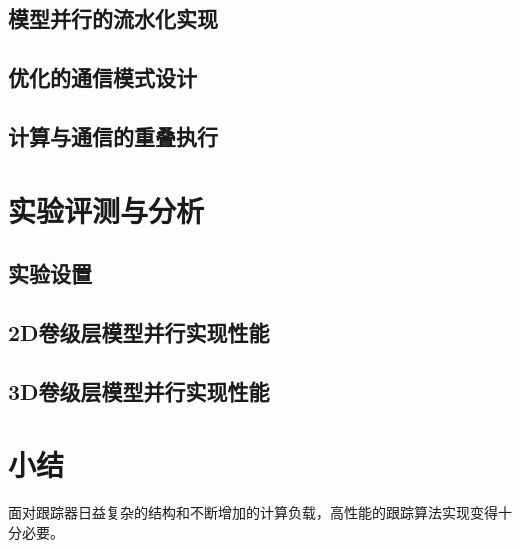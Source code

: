 \subsection{模型并行的流水化实现}


\subsection{优化的通信模式设计}


\subsection{计算与通信的重叠执行}

\section{实验评测与分析}

\subsection{实验设置}

\subsection{2D卷级层模型并行实现性能}

\subsection{3D卷级层模型并行实现性能}


\section{小结}
面对跟踪器日益复杂的结构和不断增加的计算负载，高性能的跟踪算法实现变得十分必要。
